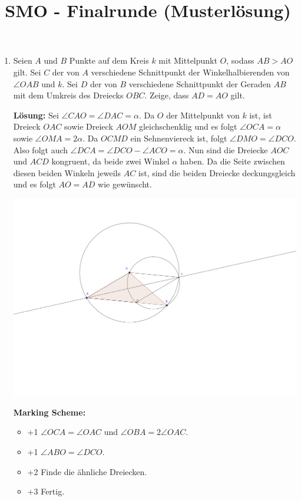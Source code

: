 \documentclass[language=german,style=solution]{smo}
\title{SMO - Finalrunde (Musterlösung)}
\begin{document}
\begin{enumerate}[label=\textbf{\arabic*.}]

\item
Seien $A$ und $B$ Punkte auf dem Kreis $k$ mit Mittelpunkt $O$, sodass $AB > AO$ gilt. Sei $C$ der von $A$ verschiedene Schnittpunkt der Winkelhalbierenden von $\angle OAB$ und $k$. Sei $D$ der von $B$ verschiedene Schnittpunkt der Geraden $AB$ mit dem Umkreis des Dreiecks $OBC$. Zeige, dass $AD = AO$ gilt.

\textbf{Lösung:} Sei $\angle CAO=\angle DAC=\alpha$. Da $O$ der Mittelpunkt von $k$ ist, ist Dreieck $OAC$ sowie Dreieck $AOM$ gleichschenklig und es folgt $\angle OCA=\alpha$ sowie $\angle OMA=2\alpha$. Da $OCMD$ ein Sehnenviereck ist, folgt $\angle DMO=\angle DCO$. Also folgt auch $\angle DCA=\angle DCO-\angle ACO=\alpha$. Nun sind die Dreiecke $AOC$ und $ACD$ kongruent, da beide zwei Winkel $\alpha$ haben. Da die Seite zwischen diesen beiden Winkeln jeweils $AC$ ist, sind die beiden Dreiecke deckungsgleich und es folgt $AO=AD$ wie gewünscht.
	
\includegraphics[width=\textwidth]{finalrunde_1_2017.png}

\textbf{Marking Scheme:}
\begin{itemize}
    \item +1 $\angle OCA = \angle OAC$ und $\angle OBA = 2\angle OAC$.
    \item +1 $\angle ABO = \angle DCO$.
    \item +2 Finde die ähnliche Dreiecken.
    \item +3 Fertig.
\end{itemize}

\newpage


\end{enumerate}
\end{document}
